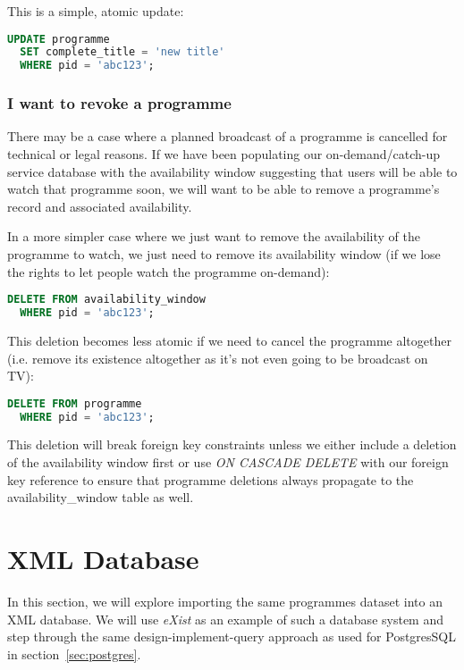 \documentclass[11pt,a4paper]{article}
\begin{document}
This is a simple, atomic update:

\begin{lstlisting}[language=SQL]
  UPDATE programme
  SET complete_title = 'new title'
  WHERE pid = 'abc123';
\end{lstlisting}

\subsubsection{I want to revoke a programme}

There may be a case where a planned broadcast of a programme is
cancelled for technical or legal reasons. If we have been populating
our on-demand/catch-up service database with the availability
window suggesting that users will be able to watch that programme soon,
we will want to be able to remove a programme's record and associated
availability.

In a more simpler case where we just want to remove the availability of
the programme to watch, we just need to remove its availability window
(if we lose the rights to let people watch the programme on-demand):

\begin{lstlisting}[language=SQL]
  DELETE FROM availability_window
  WHERE pid = 'abc123';
\end{lstlisting}

This deletion becomes less atomic if we need to cancel the programme
altogether (i.e. remove its existence altogether as it's not
even going to be broadcast on TV):

\begin{lstlisting}[language=SQL]
  DELETE FROM programme
  WHERE pid = 'abc123';
\end{lstlisting}

This deletion will break foreign key constraints unless we either
include a deletion of the availability window first or use
\emph{ON CASCADE DELETE} with our foreign key reference to ensure
that programme deletions always propagate to the
availability\_window table as well.

\section{XML Database}

In this section, we will explore importing the same programmes dataset
into an XML database. We will use \emph{eXist} as an example of such
a database system and step through the same design-implement-query
approach as used for PostgresSQL in section~\ref{sec:postgres}.
\end{document}
